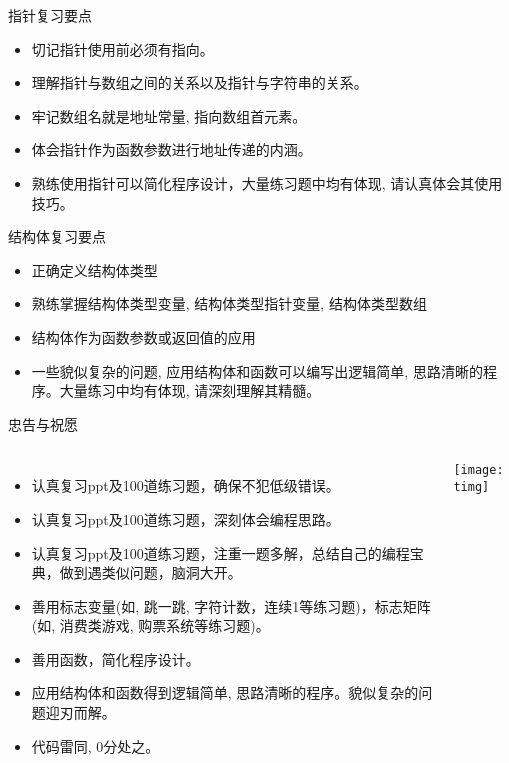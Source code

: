 \begin{frame}[fragile]{指针复习要点}
\begin{itemize}
	\item 切记指针使用前必须有指向。
	\item 理解指针与数组之间的关系以及指针与字符串的关系。
	\item 牢记数组名就是地址常量, 指向数组首元素。
	\item 体会指针作为函数参数进行地址传递的内涵。
	\item 熟练使用指针可以简化程序设计，大量练习题中均有体现, 请认真体会其使用技巧。
\end{itemize}
\end{frame}

\begin{frame}{结构体复习要点}
\begin{itemize}
	\item 正确定义结构体类型
	\item 熟练掌握结构体类型变量, 结构体类型指针变量, 结构体类型数组
	\item 结构体作为函数参数或返回值的应用
	\item 一些貌似复杂的问题, 应用结构体和函数可以编写出逻辑简单, 思路清晰的程序。大量练习中均有体现, 请深刻理解其精髓。
\end{itemize}
\end{frame}

\begin{frame}{忠告与祝愿}
\vspace{-0.2cm}
\begin{columns}
	\begin{itemize}
		\item 认真复习ppt及100道练习题，确保不犯低级错误。
		\item 认真复习ppt及100道练习题，深刻体会编程思路。
		\item 认真复习ppt及100道练习题，注重一题多解，总结自己的编程宝典，做到遇类似问题，脑洞大开。
		\item 善用标志变量(如, 跳一跳, 字符计数，连续1等练习题)，标志矩阵(如, 消费类游戏, 购票系统等练习题)。
		\item 善用函数，简化程序设计。
		\item 应用结构体和函数得到逻辑简单, 思路清晰的程序。貌似复杂的问题迎刃而解。
		\item 代码雷同, 0分处之。 
	\end{itemize}
	\centering\texttt{[image: timg]}
\end{columns}
\end{frame}

